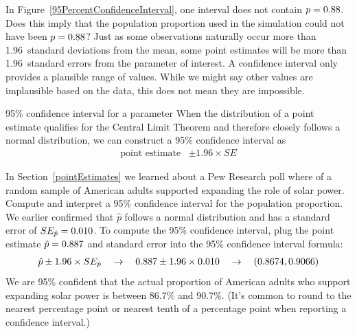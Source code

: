 \begin{examplewrap}
\begin{nexample}{In Figure~\ref{95PercentConfidenceInterval},
one interval does not contain $p = 0.88{}$.
Does this imply that the population proportion used
in the simulation could not have been
$p = 0.88{}$?}
Just as some observations naturally
occur more than 1.96~standard deviations
from the mean, some point estimates will be more than
1.96~standard errors from the parameter of interest.
A confidence interval only provides a plausible range
of values.
While we might say other values are implausible
based on the data, this does not mean they are impossible.
\end{nexample}
\end{examplewrap}

\begin{onebox}{95\% confidence interval for a parameter}
  When the distribution of a point estimate qualifies for
  the Central Limit Theorem and
  therefore closely follows a normal distribution,
  we can construct a 95\% confidence interval as
  \begin{align*}
  \text{point estimate} &\pm 1.96 \times SE
  \end{align*}
\end{onebox}

\begin{examplewrap}
\begin{nexample}{In Section~\ref{pointEstimates} we learned about
    a Pew Research poll where
    \pewsolarpollpercent{} of a random sample of
    \pewsolarpollsize{} American adults
    supported expanding the role of solar power.
    Compute and
    interpret a 95\% confidence interval for the population
    proportion.} \label{95p_ci_for_pew_solar_support}
  We earlier confirmed that $\hat{p}$ follows a normal
  distribution and has a standard error of
  $SE_{\hat{p}} = 0.010{}$.
  To compute the 95\% confidence interval, plug the
  point estimate $\hat{p} = 0.887{}$ and
  standard error into the 95\% confidence interval formula:
  \begin{align*}
  \hat{p} \pm 1.96 \times SE_{\hat{p}}
  \quad\to\quad
  0.887{} \pm 1.96 \times 0.010{}
  \quad\to\quad
  (0.8674, 0.9066)
  \end{align*}
  We are 95\% confident that the actual proportion of
  American adults who support expanding solar power is
  between 86.7\% and 90.7\%.
  (It's common to round to the nearest percentage point
  or nearest tenth of a percentage point when reporting
  a confidence interval.)
\end{nexample}
\end{examplewrap}


